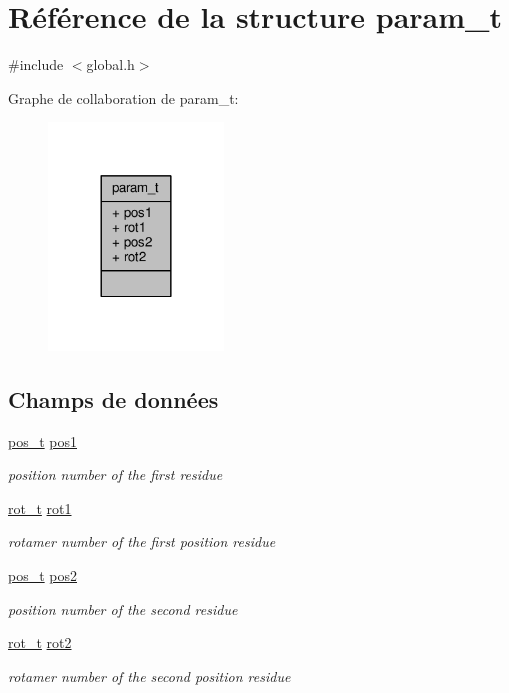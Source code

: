 \hypertarget{structparam__t}{\section{Référence de la structure param\+\_\+t}
\label{structparam__t}
}


{\ttfamily \#include $<$global.\+h$>$}



Graphe de collaboration de param\+\_\+t\+:\nopagebreak
\begin{figure}[H]
\begin{center}
\leavevmode
\includegraphics[width=132pt]{structparam__t__coll__graph}
\end{center}
\end{figure}
\subsection*{Champs de données}
\begin{DoxyCompactItemize}
\item 
\hyperlink{global_8h_ad291ff3eba2246a027eead869e223f9e}{pos\+\_\+t} \hyperlink{structparam__t_ab8de3cd20605ffa3d31da392b01c6ea0}{pos1}
\begin{DoxyCompactList}\small\item\em position number of the first residue \end{DoxyCompactList}\item 
\hyperlink{global_8h_a76c30add544d614276109f911692cecc}{rot\+\_\+t} \hyperlink{structparam__t_a3fba97c80020a66e299640ba9d78935f}{rot1}
\begin{DoxyCompactList}\small\item\em rotamer number of the first position residue \end{DoxyCompactList}\item 
\hyperlink{global_8h_ad291ff3eba2246a027eead869e223f9e}{pos\+\_\+t} \hyperlink{structparam__t_a349b644f86af0b2fe512e90404173c2e}{pos2}
\begin{DoxyCompactList}\small\item\em position number of the second residue \end{DoxyCompactList}\item 
\hyperlink{global_8h_a76c30add544d614276109f911692cecc}{rot\+\_\+t} \hyperlink{structparam__t_a491b269791ac121473a9f7145b283cdc}{rot2}
\begin{DoxyCompactList}\small\item\em rotamer number of the second position residue \end{DoxyCompactList}\end{DoxyCompactItemize}


